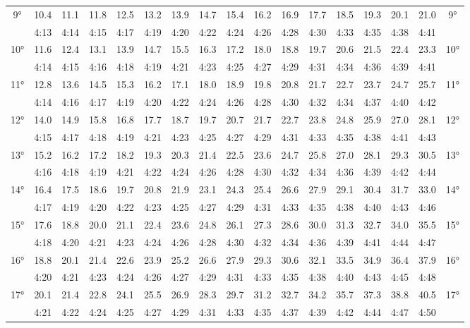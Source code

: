 \begin{footnotesize}
\begin{tabular}{c || c | c | c | c | c | c | c | c | c | c | c | c | c | c | c || c}
		\multirow{2}{*}{9°}&10.4&11.1&11.8&12.5&13.2&13.9&14.7&15.4&16.2&16.9&17.7&18.5&19.3&20.1&21.0&\multirow{2}{*}{9°}\\ \space&4:13&4:14&4:15&4:17&4:19&4:20&4:22&4:24&4:26&4:28&4:30&4:33&4:35&4:38&4:41&\space\\\hline
		\multirow{2}{*}{10°}&11.6&12.4&13.1&13.9&14.7&15.5&16.3&17.2&18.0&18.8&19.7&20.6&21.5&22.4&23.3&\multirow{2}{*}{10°}\\ \space&4:14&4:15&4:16&4:18&4:19&4:21&4:23&4:25&4:27&4:29&4:31&4:34&4:36&4:39&4:41&\space\\\hline
		\multirow{2}{*}{11°}&12.8&13.6&14.5&15.3&16.2&17.1&18.0&18.9&19.8&20.8&21.7&22.7&23.7&24.7&25.7&\multirow{2}{*}{11°}\\ \space&4:14&4:16&4:17&4:19&4:20&4:22&4:24&4:26&4:28&4:30&4:32&4:34&4:37&4:40&4:42&\space\\\hline
		\multirow{2}{*}{12°}&14.0&14.9&15.8&16.8&17.7&18.7&19.7&20.7&21.7&22.7&23.8&24.8&25.9&27.0&28.1&\multirow{2}{*}{12°}\\ \space&4:15&4:17&4:18&4:19&4:21&4:23&4:25&4:27&4:29&4:31&4:33&4:35&4:38&4:41&4:43&\space\\\hline
		\multirow{2}{*}{13°}&15.2&16.2&17.2&18.2&19.3&20.3&21.4&22.5&23.6&24.7&25.8&27.0&28.1&29.3&30.5&\multirow{2}{*}{13°}\\ \space&4:16&4:18&4:19&4:21&4:22&4:24&4:26&4:28&4:30&4:32&4:34&4:36&4:39&4:42&4:44&\space\\\hline
		\multirow{2}{*}{14°}&16.4&17.5&18.6&19.7&20.8&21.9&23.1&24.3&25.4&26.6&27.9&29.1&30.4&31.7&33.0&\multirow{2}{*}{14°}\\ \space&4:17&4:19&4:20&4:22&4:23&4:25&4:27&4:29&4:31&4:33&4:35&4:38&4:40&4:43&4:46&\space\\\hline
		\multirow{2}{*}{15°}&17.6&18.8&20.0&21.1&22.4&23.6&24.8&26.1&27.3&28.6&30.0&31.3&32.7&34.0&35.5&\multirow{2}{*}{15°}\\ \space&4:18&4:20&4:21&4:23&4:24&4:26&4:28&4:30&4:32&4:34&4:36&4:39&4:41&4:44&4:47&\space\\\hline
		\multirow{2}{*}{16°}&18.8&20.1&21.4&22.6&23.9&25.2&26.6&27.9&29.3&30.6&32.1&33.5&34.9&36.4&37.9&\multirow{2}{*}{16°}\\ \space&4:20&4:21&4:23&4:24&4:26&4:27&4:29&4:31&4:33&4:35&4:38&4:40&4:43&4:45&4:48&\space\\\hline
		\multirow{2}{*}{17°}&20.1&21.4&22.8&24.1&25.5&26.9&28.3&29.7&31.2&32.7&34.2&35.7&37.3&38.8&40.5&\multirow{2}{*}{17°}\\ \space&4:21&4:22&4:24&4:25&4:27&4:29&4:31&4:33&4:35&4:37&4:39&4:42&4:44&4:47&4:50&\space\\\hline

\end{tabular}
\end{footnotesize}
